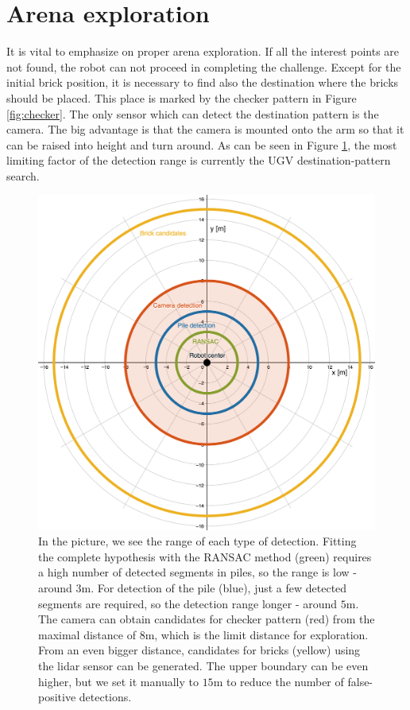 \section{Arena exploration}
It is vital to emphasize on proper arena exploration. If all the interest points are not found, the robot can not proceed in completing the challenge. Except for the initial brick position, it is necessary to find also the destination where the bricks should be placed. This place is marked by the checker pattern in Figure \ref{fig:checker}. The only sensor which can detect the destination pattern is the camera. The big advantage is that the camera is mounted onto the arm so that it can be raised into height and turn around. As can be seen in Figure \ref{fig:detection_range}, the most limiting factor of the detection range is currently the UGV destination-pattern search.

\begin{figure}[H]
	\centering
	\includegraphics[scale=0.38]{fig/detection_range.png}
	\caption[Detection ranges]{In the picture, we see the range of each type of detection. Fitting the complete hypothesis with the RANSAC method (green) requires a high number of detected segments in piles, so the range is low - around $3$m. For detection of the pile (blue), just a few detected segments are required, so the detection range longer - around $5$m. The camera can obtain candidates for checker pattern (red) from the maximal distance of $8$m, which is the limit distance for exploration. From an even bigger distance, candidates for bricks (yellow) using the lidar sensor can be generated. The upper boundary can be even higher, but we set it manually to $15$m to reduce the number of false-positive detections.}
	\label{fig:detection_range}
\end{figure}

